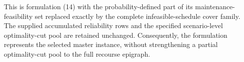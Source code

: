 \documentclass[11pt]{article}
\begin{document}
This is formulation (14) with the probability-defined part of its maintenance-feasibility set replaced exactly by the complete infeasible-schedule cover family. The supplied accumulated reliability rows and the specified scenario-level optimality-cut pool are retained unchanged. Consequently, the formulation represents the selected master instance, without strengthening a partial optimality-cut pool to the full recourse epigraph.
\end{document}
